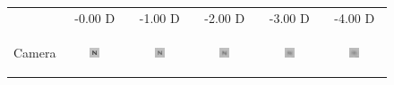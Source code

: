 
\begin{figure}[!h]
	\centering

	\begin{tabular}{@{}r@{ } c@{ } c@{ } c@{ } c@{ } c }
	&
	\small{-0.00 D} &
	\small{-1.00 D} &
	\small{-2.00 D} &
	\small{-3.00 D} &
	\small{-4.00 D} & \\

	\begin{sideways} \parbox[b]{20mm} {Camera} \end{sideways} &
	\includegraphics[width=0.185\textwidth]{__Images/05/WB_N(20-200)_-0D_to_-4D/wb_N_20-200_Camera-0,00D(lens).png} &
	\includegraphics[width=0.185\textwidth]{__Images/05/WB_N(20-200)_-0D_to_-4D/wb_N_20-200_Camera-1,00D(lens).png} &
	\includegraphics[width=0.185\textwidth]{__Images/05/WB_N(20-200)_-0D_to_-4D/wb_N_20-200_Camera-2,00D(lens).png} &
	\includegraphics[width=0.185\textwidth]{__Images/05/WB_N(20-200)_-0D_to_-4D/wb_N_20-200_Camera-3,00D(lens).png} &
	\includegraphics[width=0.185\textwidth]{__Images/05/WB_N(20-200)_-0D_to_-4D/wb_N_20-200_Camera-4,00D(lens).png} \\


\end{tabular}
\end{figure}

